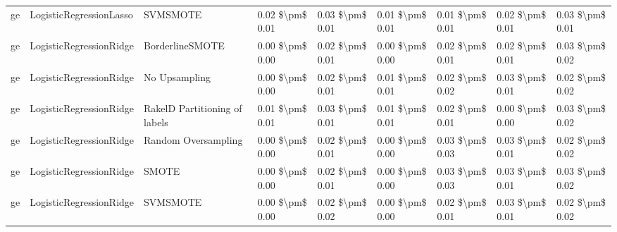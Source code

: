 \begin{tabular}{lllllllll}
      ge &         LogisticRegressionLasso &                      SVMSMOTE & 0.02 \$\textbackslash pm\$ 0.01 &           0.03 \$\textbackslash pm\$ 0.01 &       0.01 \$\textbackslash pm\$ 0.01 &        0.01 \$\textbackslash pm\$ 0.01 &                         0.02 \$\textbackslash pm\$ 0.01 &     0.03 \$\textbackslash pm\$ 0.01 \\
      ge &         LogisticRegressionRidge &               BorderlineSMOTE & 0.00 \$\textbackslash pm\$ 0.00 &           0.02 \$\textbackslash pm\$ 0.01 &       0.00 \$\textbackslash pm\$ 0.00 &        0.02 \$\textbackslash pm\$ 0.01 &                         0.02 \$\textbackslash pm\$ 0.01 &     0.03 \$\textbackslash pm\$ 0.02 \\
      ge &         LogisticRegressionRidge &                 No Upsampling & 0.00 \$\textbackslash pm\$ 0.00 &           0.02 \$\textbackslash pm\$ 0.01 &       0.01 \$\textbackslash pm\$ 0.01 &        0.02 \$\textbackslash pm\$ 0.02 &                         0.03 \$\textbackslash pm\$ 0.01 &     0.02 \$\textbackslash pm\$ 0.02 \\
      ge &         LogisticRegressionRidge & RakelD Partitioning of labels & 0.01 \$\textbackslash pm\$ 0.01 &           0.03 \$\textbackslash pm\$ 0.01 &       0.01 \$\textbackslash pm\$ 0.01 &        0.02 \$\textbackslash pm\$ 0.01 &                         0.00 \$\textbackslash pm\$ 0.00 &     0.03 \$\textbackslash pm\$ 0.02 \\
      ge &         LogisticRegressionRidge &           Random Oversampling & 0.00 \$\textbackslash pm\$ 0.00 &           0.02 \$\textbackslash pm\$ 0.01 &       0.00 \$\textbackslash pm\$ 0.00 &        0.03 \$\textbackslash pm\$ 0.03 &                         0.03 \$\textbackslash pm\$ 0.01 &     0.02 \$\textbackslash pm\$ 0.02 \\
      ge &         LogisticRegressionRidge &                         SMOTE & 0.00 \$\textbackslash pm\$ 0.00 &           0.02 \$\textbackslash pm\$ 0.01 &       0.00 \$\textbackslash pm\$ 0.00 &        0.03 \$\textbackslash pm\$ 0.03 &                         0.03 \$\textbackslash pm\$ 0.01 &     0.03 \$\textbackslash pm\$ 0.02 \\
      ge &         LogisticRegressionRidge &                      SVMSMOTE & 0.00 \$\textbackslash pm\$ 0.00 &           0.02 \$\textbackslash pm\$ 0.02 &       0.00 \$\textbackslash pm\$ 0.00 &        0.02 \$\textbackslash pm\$ 0.01 &                         0.03 \$\textbackslash pm\$ 0.01 &     0.02 \$\textbackslash pm\$ 0.02 \\

\end{tabular}
